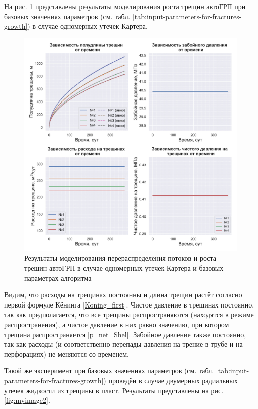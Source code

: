 На рис. \ref{fig:myimage1} представлены результаты моделирования роста трещин автоГРП при базовых значениях параметров (см. табл. \ref{tab:input-parameters-for-fractures-growth}) в случае одномерных утечек Картера.

\begin{figure}[H] 
\center
\includegraphics[width=\linewidth]{images/myimage1.jpg}
\caption{Результаты моделирования перераспределения потоков и роста трещин автоГРП в случае одномерных утечек Картера и базовых параметрах алгоритма} 
\label{fig:myimage1}
\end{figure}

Видим, что расходы на трещинах постоянны и длина трещин растёт согласно первой формуле Кёнинга \eqref{Koning_first}.
Чистое давление в трещинах постоянно, так как предполагается, что все трещины распространяются (находятся в режиме распространения), а чистое давление в них равно значению, при котором трещина распространяется \eqref{p_net_Shel}.
Забойное давление также постоянно, так как расходы (и соответственно перепады давления на трение в трубе и на перфорациях) не меняются со временем.

Такой же эксперимент при базовых значениях параметров (см. табл. \ref{tab:input-parameters-for-fractures-growth}) проведён в случае двумерных радиальных утечек жидкости из трещины в пласт.
Результаты представлены на рис. \ref{fig:myimage2}.

